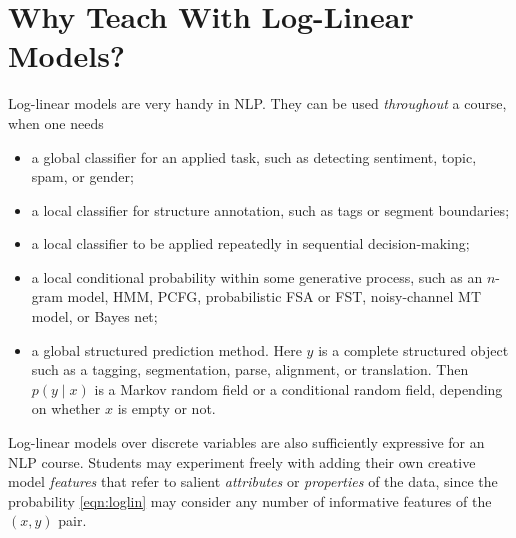 \documentclass[11pt,letterpaper]{article}
\begin{document}
\section{Why Teach With Log-Linear Models?}

Log-linear models are very handy in NLP.  They can be used {\em throughout} 
a course, when one needs 
\begin{itemize}
\item a global classifier for an applied task, such as detecting
  sentiment, topic, spam, or gender;
\item a local classifier for structure annotation,
  such as tags or segment boundaries;
\item a local classifier to be applied repeatedly in sequential decision-making;
\item a local conditional probability within some generative process, such
  as an $n$-gram model, HMM, PCFG, probabilistic FSA or FST, noisy-channel MT model,
  or Bayes net;
\item a global structured prediction method.  Here $y$ is a complete
  structured object such as a tagging, segmentation, parse, alignment, or translation.  Then $p(y
  \mid x)$ is a Markov random field or a conditional random field,
  depending on whether $x$ is empty or not.
\end{itemize}  

Log-linear models over discrete variables are also sufficiently
expressive for an NLP course.  Students may experiment freely with
adding their own creative model \textit{features} that refer to 
salient \textit{attributes} or \textit{properties} of the data, 
since the probability \eqref{eqn:loglin} may consider any number of
informative features of the $(x,y)$ pair.
\end{document}
